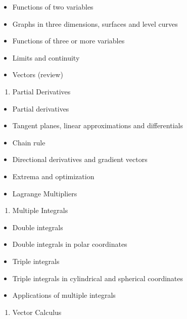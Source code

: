 \documentclass[
]{book}
\providecommand{\tightlist}{%
  \setlength{\itemsep}{0pt}\setlength{\parskip}{0pt}}
\theoremstyle{definition}
\theoremstyle{definition}
\theoremstyle{definition}
\theoremstyle{definition}
\theoremstyle{remark}
\begin{document}
\begin{itemize}
\tightlist
\item
  Functions of two variables
\item
  Graphs in three dimensions, surfaces and level curves
\item
  Functions of three or more variables
\item
  Limits and continuity
\item
  Vectors (review)
\end{itemize}

\begin{enumerate}
\def\labelenumi{\arabic{enumi}.}
\setcounter{enumi}{1}
\tightlist
\item
  Partial Derivatives
\end{enumerate}

\begin{itemize}
\tightlist
\item
  Partial derivatives
\item
  Tangent planes, linear approximations and differentials
\item
  Chain rule
\item
  Directional derivatives and gradient vectors
\item
  Extrema and optimization
\item
  Lagrange Multipliers
\end{itemize}

\begin{enumerate}
\def\labelenumi{\arabic{enumi}.}
\setcounter{enumi}{2}
\tightlist
\item
  Multiple Integrals
\end{enumerate}

\begin{itemize}
\tightlist
\item
  Double integrals
\item
  Double integrals in polar coordinates
\item
  Triple integrals
\item
  Triple integrals in cylindrical and spherical coordinates
\item
  Applications of multiple integrals
\end{itemize}

\begin{enumerate}
\def\labelenumi{\arabic{enumi}.}
\setcounter{enumi}{3}
\tightlist
\item
  Vector Calculus
\end{enumerate}
\end{document}
